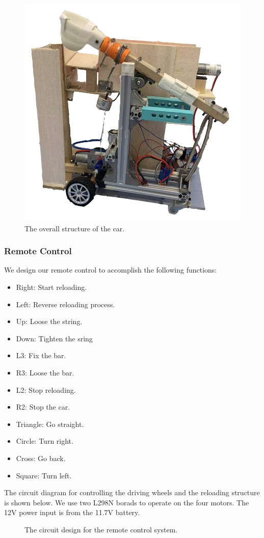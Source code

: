 \documentclass{article}
\begin{document}
\begin{figure}[H]
\centering
\includegraphics[width=0.4\linewidth]{Car1}
\caption{The overall structure of the car.}
\end{figure}

\subsubsection*{Remote Control}
We design our remote control to accomplish the following functions:
\begin{itemize}
\item Right: Start reloading.
\item Left: Reverse reloading process.
\item Up: Loose the string.
\item Down: Tighten the sring
\item L3: Fix the bar.
\item R3: Loose the bar.
\item L2: Stop reloading.
\item R2: Stop the car.
\item Triangle: Go straight.
\item Circle: Turn right.
\item Cross: Go back.
\item Square: Turn left.
\end{itemize}

The circuit diagram for controlling the driving wheels and the reloading structure is shown below. We use two L298N borads to operate on the four motors. The 12V power input is from the 11.7V battery.

\begin{figure}[H]
\centering
{}
\caption{The circuit design for the remote control system.}
\end{figure}
\end{document}

